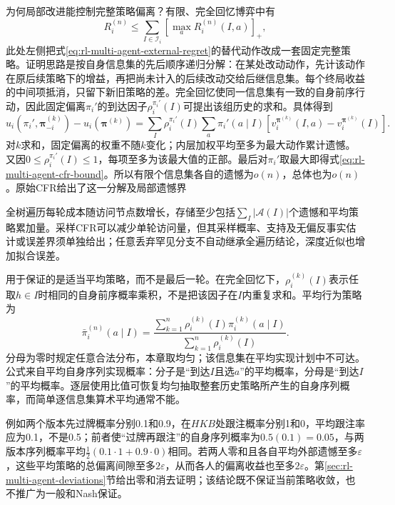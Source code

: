 为何局部改进能控制完整策略偏离？有限、完全回忆博弈中有
\begin{equation}
 R_i^{(n)}
 \leq\sum_{I\in\mathcal I_i}
        \left[\max_a R_i^{(n)}(I,a)\right]_+,
 \label{eq:rl-multi-agent-cfr-bound}
\end{equation}
此处左侧把式\eqref{eq:rl-multi-agent-external-regret}的替代动作改成一套固定完整策略。证明思路是按自身信息集的先后顺序递归分解：在某处改动动作，先计该动作在原后续策略下的增益，再把尚未计入的后续改动交给后继信息集。每个终局收益的中间项抵消，只留下新旧策略的差。完全回忆使同一信息集有一致的自身前序行动，因此固定偏离$\pi_i'$的到达因子$\rho_i^{\pi_i'}(I)$可提出该组历史的求和。具体得到
\[
 u_i(\pi_i',\bm\pi_{-i}^{(k)})-u_i(\bm\pi^{(k)})
 =\sum_I\rho_i^{\pi_i'}(I)
       \sum_a\pi_i'(a\mid I)
       [v_i^{\bm\pi^{(k)}}(I,a)-v_i^{\bm\pi^{(k)}}(I)].
\]
对$k$求和，固定偏离的权重不随$k$变化；内层加权平均至多为最大动作累计遗憾。又因$0\leq\rho_i^{\pi_i'}(I)\leq1$，每项至多为该最大值的正部。最后对$\pi_i'$取最大即得式\eqref{eq:rl-multi-agent-cfr-bound}。所以有限个信息集各自的遗憾为$o(n)$，总体也为$o(n)$。原始CFR给出了这一分解及局部遗憾界

全树遍历每轮成本随访问节点数增长，存储至少包括$\sum_I|\mathcal A(I)|$个遗憾和平均策略累加量。采样CFR可以减少单轮访问量，但其采样概率、支持及无偏反事实估计或误差界须单独给出；任意丢弃罕见分支不自动继承全遍历结论，深度近似也增加拟合误差。

用于保证的是适当平均策略，而不是最后一轮。在完全回忆下，$\rho_i^{(k)}(I)$表示任取$h\in I$时相同的自身前序概率乘积，不是把该因子在$I$内重复求和。平均行为策略为
\begin{equation}
 \bar\pi_i^{(n)}(a\mid I)=
 \frac{\sum_{k=1}^{n}\rho_i^{(k)}(I)\pi_i^{(k)}(a\mid I)}
      {\sum_{k=1}^{n}\rho_i^{(k)}(I)}.
 \label{eq:rl-multi-agent-average-behavior}
\end{equation}
分母为零时规定任意合法分布，本章取均匀；该信息集在平均实现计划中不可达。公式来自平均自身序列实现概率：分子是“到达$I$且选$a$”的平均概率，分母是“到达$I$”的平均概率。逐层使用比值可恢复均匀抽取整套历史策略所产生的自身序列概率，而简单逐信息集算术平均通常不能。

例如两个版本先过牌概率分别0.1和0.9，在$HKB$处跟注概率分别1和0，平均跟注率应为0.1，不是0.5；前者使“过牌再跟注”的自身序列概率为$0.5(0.1)=0.05$，与两版本序列概率平均$\tfrac12(0.1\cdot1+0.9\cdot0)$相同。若两人零和且各自平均外部遗憾至多$\varepsilon$，这些平均策略的总偏离间隙至多$2\varepsilon$，从而各人的偏离收益也至多$2\varepsilon$。第\ref{sec:rl-multi-agent-deviations}节给出零和消去证明；该结论既不保证当前策略收敛，也不推广为一般和Nash保证。

